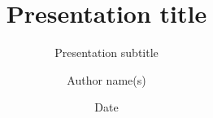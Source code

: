 \documentclass[t]{beamer}
\title{Presentation title}
\subtitle{Presentation subtitle}
\date{Date}
\author{Author name(s)}
\begin{document}
\begin{frame}
\titlepage
\end{frame}
\end{document}
